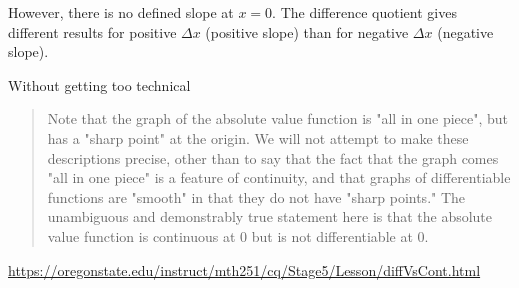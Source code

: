 \documentclass[11pt, oneside]{article}
\begin{document}
However, there is no defined slope at $x=0$.  The difference quotient gives different results for positive $\Delta x$ (positive slope) than for negative $\Delta x$ (negative slope).

Without getting too technical

\begin{quote}Note that the graph of the absolute value function is "all in one piece", but has a "sharp point" at the origin. We will not attempt to make these descriptions precise, other than to say that the fact that the graph comes "all in one piece" is a feature of continuity, and that graphs of differentiable functions are "smooth" in that they do not have "sharp points." The unambiguous and demonstrably true statement here is that the absolute value function is continuous at 0 but is not differentiable at 0.\end{quote}

\url{https://oregonstate.edu/instruct/mth251/cq/Stage5/Lesson/diffVsCont.html}
\end{document}
